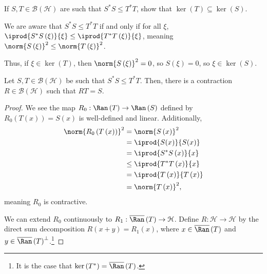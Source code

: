 \documentclass[10pt]{mypackage}
\begin{document}
\begin{exercise}
  If $S,T\in \mathcal{B}\left(\mathcal{H}\right)$ are such that $S^{\ast}S\leq T^{\ast}T$, show that $\ker\left(T\right) \subseteq \ker\left(S\right)$.
\end{exercise}
\begin{solution}
  We are aware that $S^{\ast}S\leq T^{\ast}T$ if and only if for all $\xi$, $ \iprod{S^{\ast}S\left(\xi\right)}{\xi} \leq \iprod{T^{\ast}T\left(\xi\right)}{\xi} $, meaning $\norm{S\left(\xi\right)}^2 \leq \norm{T\left(\xi\right)}^2$.\newline

  Thus, if $\xi \in \ker\left(T\right)$, then $\norm{S\left(\xi\right)}^2 = 0$, so $S\left(\xi\right) = 0$, so $\xi \in \ker\left(S\right)$.
\end{solution}
\begin{proposition}
  Let $S,T\in \mathcal{B}\left(\mathcal{H}\right)$ be such that $S^{\ast}S\leq T^{\ast}T$. Then, there is a contraction $R\in \mathcal{B}\left(\mathcal{H}\right)$ such that $RT = S$.
\end{proposition}
\begin{proof}
  We see the map $R_0: \Ran\left(T\right)\rightarrow \Ran\left(S\right)$ defined by $R_0\left(T\left(x\right)\right) = S\left(x\right)$ is well-defined and linear. Additionally,
  \begin{align*}
    \norm{R_0\left(T\left(x\right)\right)}^2 &= \norm{S\left(x\right)}^2\\
                                             &= \iprod{S(x)}{S(x)}\\
                                             &= \iprod{S^{\ast}S\left(x\right)}{x}\\
                                             &\leq \iprod{T^{\ast}T\left(x\right)}{x}\\
                                             &= \iprod{T\left(x\right)}{T\left(x\right)}\\
                                             &= \norm{T\left(x\right)}^2,
  \end{align*}
  meaning $R_0$ is contractive.\newline

  We can extend $R_0$ continuously to $R_1: \overline{\Ran}\left(T\right)\rightarrow \mathcal{H}$. Define $R: \mathcal{H}\rightarrow \mathcal{H}$ by the direct sum decomposition $R\left(x+y\right) = R_1\left(x\right)$, where $x\in \overline{\Ran}\left(T\right)$ and $y\in \overline{\Ran}\left(T\right)^{\perp}$.\footnote{It is the case that $\ker\left(T^{\ast}\right) = \overline{\Ran}\left(T\right)$.}
\end{proof}
\end{document}
